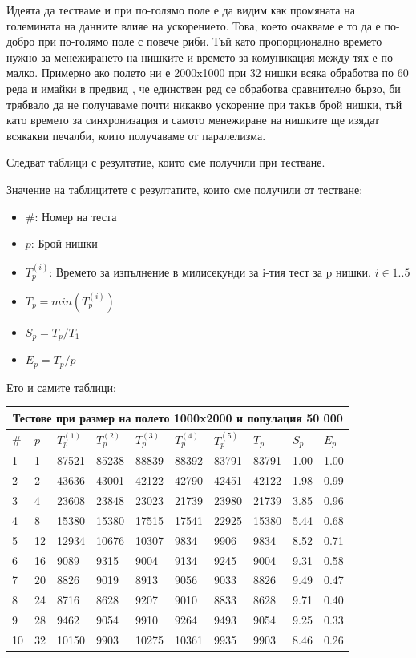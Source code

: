 \documentclass[12pt]{article}
\begin{document}
Идеята да тестваме и при по-голямо поле е да видим как промяната на големината на данните
влияе на ускорението. Това, което очакваме е то да е по-добро при по-голямо поле с повече риби.
Тъй като пропорционално времето нужно за менежирането на нишките и времето за комуникация между тях
е по-малко. Примерно ако полето ни е 2000x1000 при 32 нишки всяка обработва по 60 реда и имайки в предвид
, че единствен ред се обработва сравнително бързо, би трябвало да не получаваме почти никакво ускорение при
такъв брой нишки, тъй като времето за синхронизация и самото менежиране на нишките ще изядат всякакви
печалби, които получаваме от паралелизма.

\bigbreak

Следват таблици с резултатие, които сме получили при тестване.

\bigbreak
Значение на таблицитете с резултатите, които сме получили от тестване:
\begin{itemize}
	\item \#: Номер на теста
	\item $p$: Брой нишки
	\item $T^{(i)}_p$: Времето за изпълнение в милисекунди за i-тия тест за p нишки. $i \in 1..5$
	\item $T_p = min(T^{(i)}_p)$
	\item $S_p = T_p / T_1$
	\item $E_p = T_p / p$
\end{itemize}
\bigbreak


Ето и самите таблици:
\bigbreak

\begin{tabular}{ |p{0.6cm}||p{1cm}|p{1cm}|p{1cm}|p{1cm}|p{1cm}|p{1cm}|p{1cm}|p{0.9cm}|p{0.9cm}| }
 \hline
 \multicolumn{10}{|c|}{Тестове при размер на полето 1000x2000 и популация 50 000} \\
 \hline
 \# & $p$ & $T^{(1)}_p$ & $T^{(2)}_p$ & $T^{(3)}_p$ & $T^{(4)}_p$ & $T^{(5)}_p$ & $T_p$ & $S_p$ & $E_p$ \\
 \hline
1  & 1  & 87521 & 85238 & 88839 & 88392 & 83791 & 83791 & 1.00 & 1.00 \\
2  & 2  & 43636 &  43001 & 42122 & 42790 & 42451 & 42122 & 1.98 & 0.99 \\
3  & 4  & 23608 & 23848 & 23023 & 21739 & 23980 & 21739 & 3.85 & 0.96 \\
4  & 8  & 15380 & 15380 & 17515 & 17541 & 22925 & 15380 & 5.44 & 0.68 \\
5  & 12 & 12934 & 10676 & 10307 & 9834 & 9906 & 9834 & 8.52 & 0.71 \\
6  & 16 & 9089 & 9315 & 9004 & 9134 & 9245 & 9004 & 9.31 & 0.58 \\
7  & 20 & 8826 & 9019 & 8913 & 9056 & 9033 & 8826 & 9.49 & 0.47 \\
8  & 24 & 8716 & 8628 & 9207 & 9010 & 8833 & 8628 & 9.71 & 0.40 \\
9  & 28 & 9462 & 9054 & 9910 & 9264 & 9493 & 9054 & 9.25 & 0.33 \\
10 & 32 & 10150 & 9903 & 10275 & 10361 & 9935 & 9903 & 8.46 & 0.26 \\
 \hline
\end{tabular}
\end{document}

